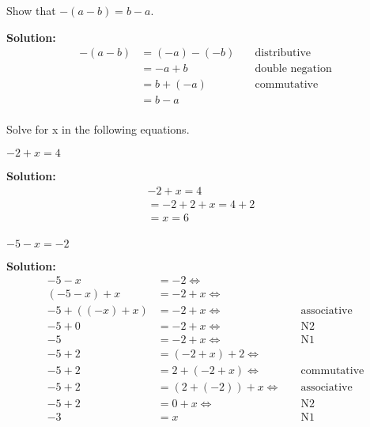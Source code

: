 \begin{tcolorbox}[title=Problem 13, breakable]
Show that $-(a - b) = b - a$.
\end{tcolorbox}

\textbf{Solution:}
\begin{align*}
-(a - b) &= (-a) - (-b)  & \quad \text{distributive} \\
&= -a + b & \quad \text{double negation} \\
&= b + (-a) & \quad \text{commutative} \\
&= b - a & \quad \text{} \\
\end{align*}


Solve for x in the following equations.
\begin{tcolorbox}[title=Problem 14, breakable]
$-2 + x = 4$
\end{tcolorbox}

\textbf{Solution:}
\begin{align*}
-2 + x = 4  & \\
=-2 + 2 + x = 4 + 2 & \\
=x = 6 & \\
\end{align*}

\begin{tcolorbox}[title=Problem 19, breakable]
$-5 - x = -2$
\end{tcolorbox}

\textbf{Solution:}
\begin{align*}
-5 - x &= -2 \Leftrightarrow & \quad \text{} \\ 
(-5 - x) + x &= -2 + x \Leftrightarrow  & \quad \text{}  \\
-5 + ((-x) + x) &= -2 + x \Leftrightarrow  & \quad \text{associative}  \\
-5 + 0 &= -2 + x \Leftrightarrow  & \quad \text{N2}  \\
-5 &= -2 + x \Leftrightarrow & \quad \text{N1} \\
-5 + 2 &= (-2 + x) + 2 \Leftrightarrow  & \quad \text{}  \\ 
-5 + 2 &= 2 + (-2 + x) \Leftrightarrow  & \quad \text{commutative}  \\ 
-5 + 2 &= (2 + (-2)) + x \Leftrightarrow  & \quad \text{associative}  \\ 
-5 + 2 &= 0 + x \Leftrightarrow  & \quad \text{N2}  \\ 
-3 &= x  & \quad \text{N1}  \\
\end{align*}


